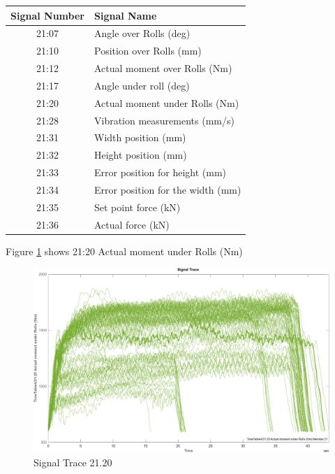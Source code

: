 \documentclass{article}
\begin{document}
\begin{center}
\begin{tabular}{ |c|l| }
 \hline
 Signal Number & Signal Name \\ 
 \hline
21:07 & Angle over Rolls (deg) \\
 \hline
21:10 & Position over Rolls (mm) \\
 \hline
21:12 & Actual moment over Rolls (Nm) \\
 \hline
21:17 & Angle under roll (deg) \\
 \hline
21:20 & Actual moment under Rolls (Nm) \\
 \hline
21:28 & Vibration measurements (mm/s) \\ 
 \hline              
21:31 & Width position (mm) \\
 \hline
21:32 & Height position (mm) \\
 \hline
21:33 & Error position for height (mm) \\
 \hline
21:34 & Error position for the width (mm) \\
 \hline
21:35 & Set point force (kN) \\
 \hline
21:36 & Actual force (kN) \\
 \hline
\end{tabular}
\label{signalNames}
\end{center}

Figure \ref{fig:SignalTrace21.20} shows 21:20 Actual moment under Rolls (Nm)
\begin{figure}[H]
    \centering
    \includegraphics[width=\textwidth, height=\textheight, keepaspectratio]{figures/SignalTrace21.20.png}
    \caption{Signal Trace 21.20}
    \label{fig:SignalTrace21.20}
\end{figure}
\end{document}
